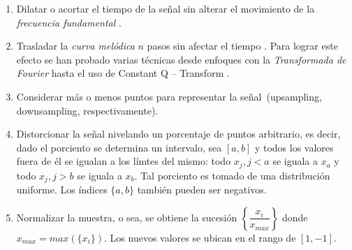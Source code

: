 \begin{enumerate}
\item Dilatar o acortar el tiempo de la se\~nal sin alterar el movimiento de la \emph{frecuencia fundamental} \cite{lu2017bidirectional, bhardwajaudio}.
\item Trasladar la \emph{curva mel\'odica} $n$ pasos sin afectar el tiempo \cite{bhardwajaudio}. Para lograr este efecto se han probado varias t\'ecnicas \cite{sturm2006pitch} desde enfoques con la \emph{Transformada de Fourier} hasta el uso de Constant Q -- Transform \cite{schorkhuber2012pitch}.
\item Considerar m\'as o menos puntos para representar la se\~nal~(upsampling\cite[ac\'apite 4.6.2]{oppenheim2001discrete}, downsampling\cite[ac\'apite 4.6.2]{oppenheim2001discrete}, respectivamente).
\item Distorcionar la se\~nal nivelando un porcentaje de puntos arbitrario, es decir, dado el porciento se determina un intervalo, sea $[a,b]$ y todos los valores fuera de \'el se igualan a los l\'imtes del mismo: todo $x_j, j < a$ se iguala a $x_a$ y todo $x_j, j>b$ se iguala a $x_b$. Tal porciento es tomado de una distribuci\'on uniforme. Los \'indices $\{a,b\}$ tambi\'en pueden ser negativos.
\item Normalizar la muestra, o sea, se obtiene la sucesi\'on $\left\{ \dfrac{x_i}{x_{max}}  \right\}$ donde $x_{max} = max(\{x_i\})$. Los nuevos valores se ubican en el rango de $[1,-1]$.
\end{enumerate}